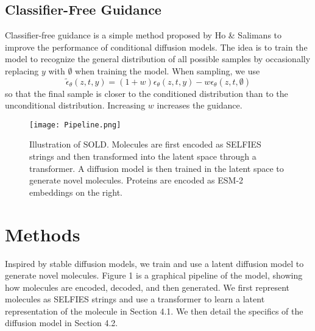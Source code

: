 \documentclass[11pt]{article}
\begin{document}
\subsection{Classifier-Free Guidance}
Classifier-free guidance is a simple method proposed by
Ho \& Salimans \cite{ho2022classifierfreediffusionguidance} to improve the performance
of conditional diffusion models. The idea is to train the model to 
recognize the general distribution of all possible samples by
occasionally replacing $y$ with $\emptyset$ when training the model.
When sampling, we use 
\begin{equation}
    \tilde{\epsilon}_{\theta}(z, t, y) = (1 + w)\epsilon_{\theta}(z, t, y)
    - w\epsilon_{\theta}(z, t, \emptyset)
\end{equation}
so that the final sample is closer to the conditioned distribution
than to the unconditional distribution. Increasing $w$ increases the 
guidance. 

\begin{figure*}[ht]
    \centering
    \texttt{[image: Pipeline.png]}
    \caption{Illustration of SOLD. Molecules are first 
    encoded as SELFIES strings and then transformed into the 
    latent space through a transformer. A diffusion model 
    is then trained in the latent space to generate novel
    molecules. Proteins are encoded as ESM-2 embeddings on the 
    right.}
\end{figure*}

\section{Methods}
Inspired by stable diffusion models, we train and use a latent
diffusion model to generate novel molecules. Figure 1 is a graphical 
pipeline of the model, showing how molecules are encoded, decoded, and then 
generated. We first represent
molecules as SELFIES strings and use a transformer to learn a 
latent representation of the molecule in Section 4.1. We then
detail the specifics of the diffusion model in Section 4.2. 
\end{document}
